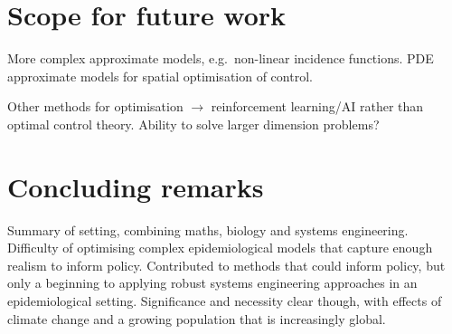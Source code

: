 \section{Scope for future work}

More complex approximate models, e.g.\ non-linear incidence functions. PDE approximate models for spatial optimisation of control.

Other methods for optimisation $\rightarrow$ reinforcement learning/AI rather than optimal control theory. Ability to solve larger dimension problems?

\section{Concluding remarks}

Summary of setting, combining maths, biology and systems engineering. Difficulty of optimising complex epidemiological models that capture enough realism to inform policy. Contributed to methods that could inform policy, but only a beginning to applying robust systems engineering approaches in an epidemiological setting. Significance and necessity clear though, with effects of climate change and a growing population that is increasingly global.